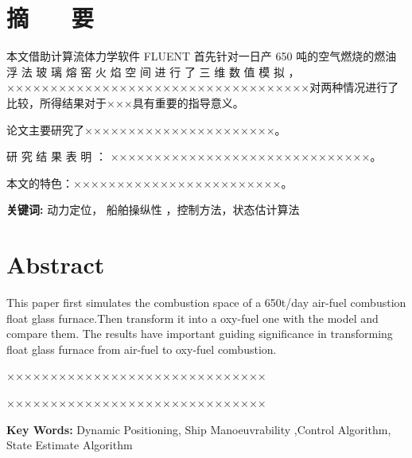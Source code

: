 \section*{\heiti {} \centering 摘 ~~ 要}

\vskip0.5cm
本文借助计算流体力学软件 FLUENT 首先针对一日产 650 吨的空气燃烧的燃油浮 法 玻 璃 熔 窑 火 焰 空 间 进 行 了 三 维 数 值 模 拟 ，×××××××××××××××××××××××××××××××××××对两种情况进行了比较，所得结果对于×××具有重要的指导意义。 

论文主要研究了××××××××××××××××××××××。 

研 究 结 果 表 明 ： ××××××××××××××××××××××××××××××。 

本文的特色：××××××××××××××××××××××××。

\textbf{\heiti {} 关键词:}  动力定位， 船舶操纵性 ，控制方法，状态估计算法

\clearpage


\section*{ \centering \textbf{Abstract} }

This paper first simulates the combustion space of a 650t/day air-fuel combustion 
float glass furnace.Then transform it into a oxy-fuel one with the model and compare 
them. The results have important guiding significance in transforming float glass furnace 
from air-fuel to oxy-fuel combustion.   

××××××××××××××××××××××××××××××

××××××××××××××××××××××××××××××

\textbf{ Key Words:} Dynamic Positioning, Ship Manoeuvrability ,Control Algorithm, State Estimate Algorithm
